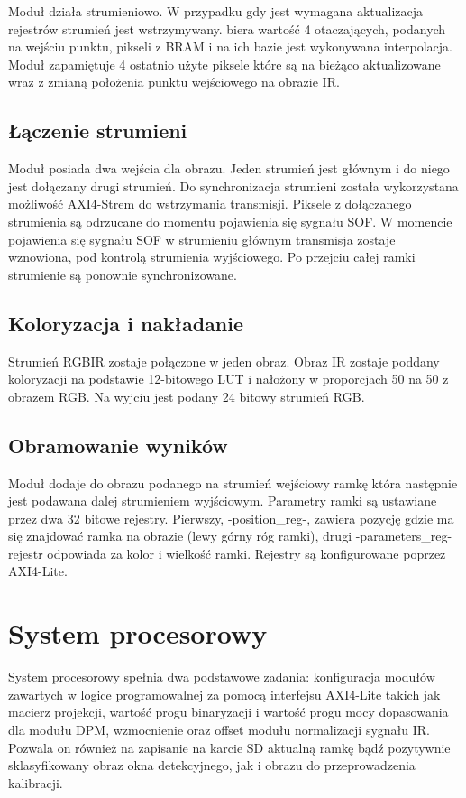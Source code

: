 Moduł działa strumieniowo. W przypadku gdy jest wymagana aktualizacja rejestrów strumień jest wstrzymywany.
biera wartość 4 otaczających, podanych na wejściu punktu, pikseli z BRAM i na ich bazie jest wykonywana interpolacja. Moduł zapamiętuje 4 ostatnio użyte piksele które są na bieżąco aktualizowane wraz z zmianą położenia punktu wejściowego na obrazie IR.
\subsection{Łączenie strumieni}
Moduł posiada dwa wejścia dla obrazu. Jeden strumień jest głównym i do niego jest dołączany drugi strumień. Do synchronizacja strumieni została wykorzystana możliwość AXI4-Strem do wstrzymania transmisji. Piksele z dołączanego strumienia są odrzucane do momentu pojawienia się sygnału SOF. W momencie pojawienia się sygnału SOF w strumieniu głównym transmisja zostaje wznowiona, pod kontrolą strumienia wyjściowego. Po przejciu całej ramki strumienie są ponownie synchronizowane.  
\subsection{Koloryzacja i nakładanie}
Strumień RGBIR zostaje połączone w jeden obraz. Obraz IR zostaje poddany koloryzacji na podstawie 12-bitowego LUT i nałożony w proporcjach 50 na 50 z obrazem RGB. Na wyjciu jest podany 24 bitowy strumień RGB.

\subsection{Obramowanie wyników}
Moduł dodaje do obrazu podanego na strumień wejściowy ramkę która następnie jest podawana dalej strumieniem wyjściowym. Parametry ramki są ustawiane przez dwa 32 bitowe rejestry. Pierwszy, -position\_reg-, zawiera pozycję gdzie ma się znajdować ramka na obrazie (lewy górny róg ramki), drugi -parameters\_reg- rejestr odpowiada za kolor i wielkość ramki. Rejestry są konfigurowane poprzez AXI4-Lite.

\section{System procesorowy}

System procesorowy spełnia dwa podstawowe zadania: konfiguracja modułów zawartych w logice programowalnej za pomocą interfejsu AXI4-Lite takich jak macierz projekcji, wartość progu binaryzacji i wartość progu mocy dopasowania dla modułu DPM, wzmocnienie oraz offset modułu normalizacji sygnału IR. Pozwala on również na zapisanie na karcie SD aktualną ramkę bądź pozytywnie sklasyfikowany obraz okna detekcyjnego, jak i obrazu do przeprowadzenia kalibracji.


